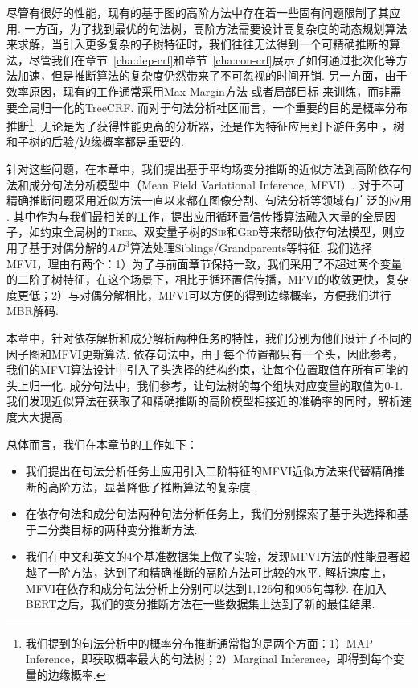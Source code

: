 尽管有很好的性能，现有的基于图的高阶方法中存在着一些固有问题限制了其应用.
一方面，为了找到最优的句法树，高阶方法需要设计高复杂度的动态规划算法来求解，当引入更多复杂的子树特征时，我们往往无法得到一个可精确推断的算法，尽管我们在章节~\ref{cha:dep-crf}和章节~\ref{cha:con-crf}展示了如何通过批次化等方法加速，但是推断算法的复杂度仍然带来了不可忽视的时间开销.
另一方面，由于效率原因，现有的工作通常采用Max Margin方法 \citep{mcdonald-pereira-2006-online}或者局部目标 \citep{ji-etal-2019-graph}来训练，而非需要全局归一化的TreeCRF.
而对于句法分析社区而言，一个重要的目的是概率分布推断\footnote{我们提到的句法分析中的概率分布推断通常指的是两个方面：1）MAP Inference，即获取概率最大的句法树；2）Marginal Inference，即得到每个变量的边缘概率.}.
无论是为了获得性能更高的分析器，还是作为特征应用到下游任务中 \citep{zhang-etal-2019-syntax,zhang-etal-2020-syntax}，树和子树的后验/边缘概率都是重要的.

针对这些问题，在本章中，我们提出基于平均场变分推断的近似方法到高阶依存句法和成分句法分析模型中（Mean Field Variational Inference, MFVI）.
对于不可精确推断问题采用近似方法一直以来都在图像分割、句法分析等领域有广泛的应用 \citep{krahenbuhl-etal-2011-efficient,wang-etal-2019-second,martins-etal-2011-dual}.
其中作为与我们最相关的工作，\citet{smith-eisner-2008-dependency,gormley-etal-2015-approximation}提出应用循环置信传播算法融入大量的全局因子，如约束全局树的\textsc{Tree}、双变量子树的\textsc{Sib}和\textsc{Grd}等来帮助依存句法模型，\citet{fonseca-martins-2020-revisiting}则应用了基于对偶分解的$AD^3$算法处理Siblings/Grandparents等特征.
我们选择MFVI，理由有两个：1）为了与前面章节保持一致，我们采用了不超过两个变量的二阶子树特征，在这个场景下，相比于循环置信传播，MFVI的收敛更快，复杂度更低；2）与对偶分解相比，MFVI可以方便的得到边缘概率，方便我们进行MBR解码.

本章中，针对依存解析和成分解析两种任务的特性，我们分别为他们设计了不同的因子图和MFVI更新算法.
依存句法中，由于每个位置都只有一个头，因此参考\citet{wang-tu-2020-second}，我们的MFVI算法设计中引入了头选择的结构约束，让每个位置取值在所有可能的头上归一化.
成分句法中，我们参考\citet{naradowsky-etal-2012-grammarless,wang-etal-2019-second,smith-eisner-2008-dependency}，让句法树的每个组块对应变量的取值为0-1.
我们发现近似算法在获取了和精确推断的高阶模型相接近的准确率的同时，解析速度大大提高.

总体而言，我们在本章节的工作如下：
\begin{itemize}
  \item 我们提出在句法分析任务上应用引入二阶特征的MFVI近似方法来代替精确推断的高阶方法，显著降低了推断算法的复杂度.
  \item 在依存句法和成分句法两种句法分析任务上，我们分别探索了基于头选择和基于二分类目标的两种变分推断方法.
  \item 我们在中文和英文的4个基准数据集上做了实验，发现MFVI方法的性能显著超越了一阶方法，达到了和精确推断的高阶方法可比较的水平.
        解析速度上，MFVI在依存和成分句法分析上分别可以达到1,126句和905句每秒.
        在加入BERT之后，我们的变分推断方法在一些数据集上达到了新的最佳结果.

\end{itemize}

